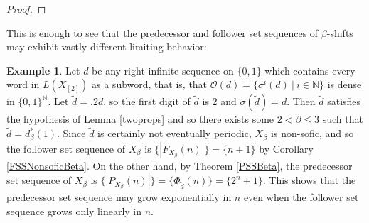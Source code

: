\documentclass{amsart}
\theoremstyle{definition}
\newtheorem{example}[theorem]{Example}
\numberwithin{equation}{section}
\begin{document}
\begin{proof}
\end{proof}

This is enough to see that the predecessor and follower set sequences of $\beta$-shifts may exhibit vastly different limiting behavior:

\begin{example}
Let $d$ be any right-infinite sequence on $\{0,1\}$ which contains every word in $L(X_{[2]})$ as a subword, that is, that $\mathcal{O}(d) = \{\sigma^i(d) \> | \> i \in \mathbb{N}\}$ is dense in $\{0,1\}^\mathbb{N}$. Let $\tilde{d} = .2d$, so the first digit of $\tilde{d}$ is 2 and $\sigma(\tilde{d}) = d$. Then $\tilde{d}$ satisfies the hypothesis of Lemma \ref{twoprops} and so there exists some $2 < \beta \leq 3$ such that $\tilde{d} = d_\beta^*(1)$. Since $\tilde{d}$ is certainly not eventually periodic, $X_\beta$ is non-sofic, and so the follower set sequence of $X_\beta$ is $\{|F_{X_\beta}(n)|\} = \{n+1\}$ by Corollary \ref{FSSNonsoficBeta}. On the other hand, by Theorem \ref{PSSBeta}, the predecessor set sequence of $X_\beta$ is $\{|P_{X_\beta}(n)|\} = \{\Phi_{\tilde{d}}(n)\} = \{2^n + 1\}$. This shows that the predecessor set sequence may grow exponentially in $n$ even when the follower set sequence grows only linearly in $n$.
\end{example}
\end{document}
